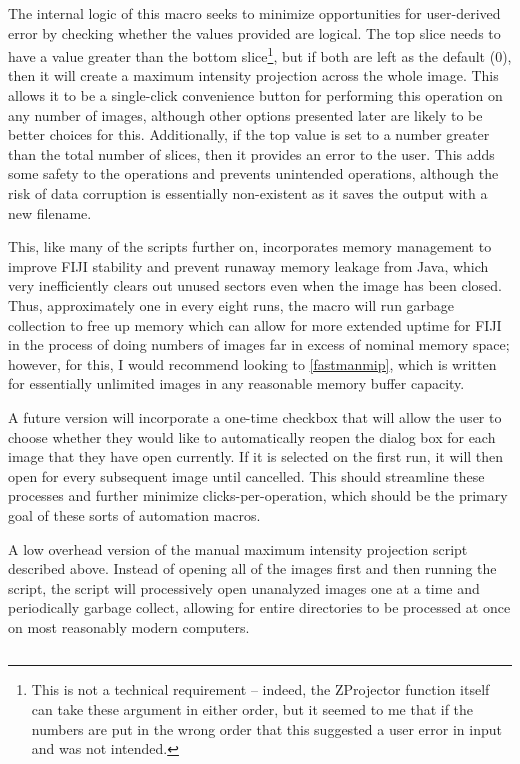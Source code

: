 The internal logic of this macro seeks to minimize opportunities for user\hyp{}derived error by checking whether the values provided are logical. The top slice needs to have a value greater than the bottom slice\footnote{This is not a technical requirement -- indeed, the ZProjector function itself can take these argument in either order, but it seemed to me that if the numbers are put in the wrong order that this suggested a user error in input and was not intended.}, but if both are left as the default (0), then it will create a maximum intensity projection across the whole image. This allows it to be a single\hyp{}click convenience button for performing this operation on any number of images, although other options presented later are likely to be better choices for this. Additionally, if the top value is set to a number greater than the total number of slices, then it provides an error to the user. This adds some safety to the operations and prevents unintended operations, although the risk of data corruption is essentially non\hyp{}existent as it saves the output with a new filename. 

This, like many of the scripts further on, incorporates memory management to improve FIJI stability and prevent runaway memory leakage from Java, which very inefficiently clears out unused sectors even when the image has been closed. Thus, approximately one in every eight runs, the macro will run garbage collection to free up memory which can allow for more extended uptime for FIJI in the process of doing numbers of images far in excess of nominal memory space; however, for this, I would recommend looking to \autoref{fastmanmip}, which is written for essentially unlimited images in any reasonable memory buffer capacity.

A future version will incorporate a one\hyp{}time checkbox that will allow the user to choose whether they would like to automatically reopen the dialog box for each image that they have open currently. If it is selected on the first run, it will then open for every subsequent image until cancelled. This should streamline these processes and further minimize clicks\hyp{}per\hyp{}operation, which should be the primary goal of these sorts of automation macros.

\begin{code}
\caption{A low overhead version of the manual maximum intensity projection script described above. Instead of opening all of the images first and then running the script, the script will processively open unanalyzed images one at a time and periodically garbage collect, allowing for entire directories to be processed at once on most reasonably modern computers.}
\label{fastmanmip}

\inputminted[breaklines,frame=single,fontsize=\small]{python}{source/fast_manMIPper.py}

\end{code}

